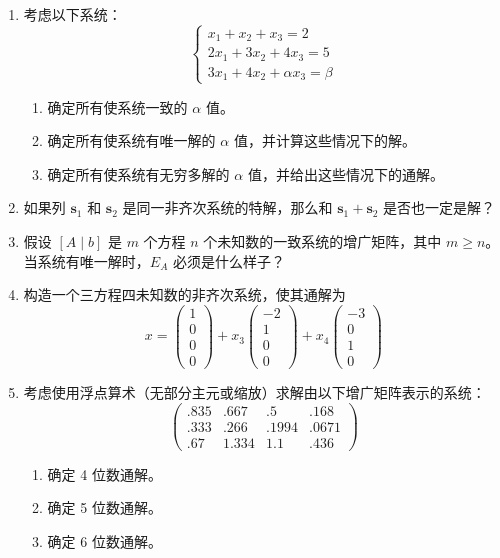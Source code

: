 \begin{enumerate}[leftmargin=*, label=\bfseries 2.5.\arabic*]
\item 考虑以下系统：
\[
\begin{cases}
x_{1} + x_{2} + x_{3} = 2 \\
2x_{1} + 3x_{2} + 4x_{3} = 5 \\
3x_{1} + 4x_{2} + \alpha x_{3} = \beta
\end{cases}
\]
\begin{enumerate}[label=(\alph*)]
    \item 确定所有使系统一致的 \(\alpha\) 值。
    \item 确定所有使系统有唯一解的 \(\alpha\) 值，并计算这些情况下的解。
    \item 确定所有使系统有无穷多解的 \(\alpha\) 值，并给出这些情况下的通解。
\end{enumerate}

\item 如果列 \(\mathbf{s}_{1}\) 和 \(\mathbf{s}_{2}\) 是同一非齐次系统的特解，那么和 \(\mathbf{s}_{1} + \mathbf{s}_{2}\) 是否也一定是解？

\item 假设 \([A \mid b]\) 是 \(m\) 个方程 \(n\) 个未知数的一致系统的增广矩阵，其中 \(m \geq n\)。当系统有唯一解时，\(E_{A}\) 必须是什么样子？

\item 构造一个三方程四未知数的非齐次系统，使其通解为
\[
x = \begin{pmatrix} 1 \\ 0 \\ 0 \\ 0 \end{pmatrix} +
x_{3} \begin{pmatrix} -2 \\ 1 \\ 0 \\ 0 \end{pmatrix} +
x_{4} \begin{pmatrix} -3 \\ 0 \\ 1 \\ 0 \end{pmatrix}
\]

\item 考虑使用浮点算术（无部分主元或缩放）求解由以下增广矩阵表示的系统：
\[
\begin{pmatrix}
.835 & .667 & .5 & .168 \\
.333 & .266 & .1994 & .0671 \\
.67 & 1.334 & 1.1 & .436
\end{pmatrix}
\]
\begin{enumerate}[label=(\alph*)]
    \item 确定 4 位数通解。
    \item 确定 5 位数通解。
    \item 确定 6 位数通解。
\end{enumerate}
\end{enumerate}
